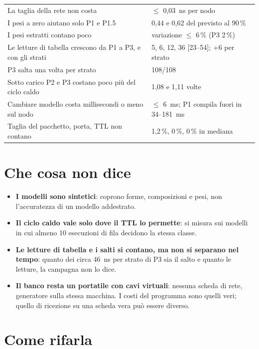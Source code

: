 \documentclass[11pt,a4paper,oneside]{report}
\begin{document}
\begin{center}
\begin{longtable}{@{}p{8.6cm}p{5.2cm}@{}}
La taglia della rete non costa & $\leq$ 0,03~ns per nodo \\
I pesi a zero aiutano solo P1 e P1.5 & 0,44 e 0,62 del previsto al 90\,\% \\
I pesi estratti contano poco & variazione $\leq$ 6\,\% (P3 2\,\%) \\
Le letture di tabella crescono da P1 a P3, e con gli strati & 5, 6, 12, 36 [23--54]; +6 per strato \\
P3 salta una volta per strato & 108/108 \\
Sotto carico P2 e P3 costano poco più del ciclo caldo & 1,08 e 1,11 volte \\
Cambiare modello costa millisecondi o meno sul nodo & $\leq$ 6~ms; P1 compila fuori in 34--181~ms \\
Taglia del pacchetto, porta, TTL non contano & 1,2\,\%, 0\,\%, 0\,\% in mediana \\
\bottomrule
\end{longtable}
\end{center}

\section{Che cosa non dice}

\begin{itemize}
  \item \textbf{I modelli sono sintetici}: coprono forme, composizioni e pesi, non
        l'accuratezza di un modello addestrato.
  \item \textbf{Il ciclo caldo vale solo dove il TTL lo permette}: si misura sui
        modelli in cui almeno 10 esecuzioni di fila decidono la stessa classe.
  \item \textbf{Le letture di tabella e i salti si contano, ma non si separano nel
        tempo}: quanto dei circa 46~ns per strato di P3 sia il salto e quanto le
        letture, la campagna non lo dice.
  \item \textbf{Il banco resta un portatile con cavi virtuali}: nessuna scheda di
        rete, generatore sulla stessa macchina. I costi del programma sono quelli
        veri; quello di ricezione su una scheda vera può essere diverso.
\end{itemize}

\section{Come rifarla}
\end{document}
